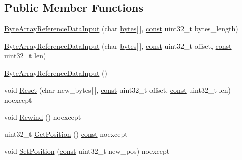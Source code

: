 \subsection*{Public Member Functions}
\begin{DoxyCompactItemize}
\item 
\mbox{\hyperlink{classlucene_1_1core_1_1store_1_1ByteArrayReferenceDataInput_aaeb2166ee337aa6f737b7c184924e4dc}{Byte\+Array\+Reference\+Data\+Input}} (char \mbox{\hyperlink{classlucene_1_1core_1_1store_1_1ByteArrayReferenceDataInput_ac71ae2183a9bd8ee669a7d5212a48d48}{bytes}}\mbox{[}$\,$\mbox{]}, \mbox{\hyperlink{ZlibCrc32_8h_a2c212835823e3c54a8ab6d95c652660e}{const}} uint32\+\_\+t bytes\+\_\+length)
\item 
\mbox{\hyperlink{classlucene_1_1core_1_1store_1_1ByteArrayReferenceDataInput_a0c0f41a361e85f1b081295c375ba5a65}{Byte\+Array\+Reference\+Data\+Input}} (char \mbox{\hyperlink{classlucene_1_1core_1_1store_1_1ByteArrayReferenceDataInput_ac71ae2183a9bd8ee669a7d5212a48d48}{bytes}}\mbox{[}$\,$\mbox{]}, \mbox{\hyperlink{ZlibCrc32_8h_a2c212835823e3c54a8ab6d95c652660e}{const}} uint32\+\_\+t offset, \mbox{\hyperlink{ZlibCrc32_8h_a2c212835823e3c54a8ab6d95c652660e}{const}} uint32\+\_\+t len)
\item 
\mbox{\hyperlink{classlucene_1_1core_1_1store_1_1ByteArrayReferenceDataInput_a7139a4a2aee2030b6efcf79b798d6435}{Byte\+Array\+Reference\+Data\+Input}} ()
\item 
void \mbox{\hyperlink{classlucene_1_1core_1_1store_1_1ByteArrayReferenceDataInput_a287e2f7dbaa01e82bc6ad0eb787c263c}{Reset}} (char new\+\_\+bytes\mbox{[}$\,$\mbox{]}, \mbox{\hyperlink{ZlibCrc32_8h_a2c212835823e3c54a8ab6d95c652660e}{const}} uint32\+\_\+t offset, \mbox{\hyperlink{ZlibCrc32_8h_a2c212835823e3c54a8ab6d95c652660e}{const}} uint32\+\_\+t len) noexcept
\item 
void \mbox{\hyperlink{classlucene_1_1core_1_1store_1_1ByteArrayReferenceDataInput_a08128c222d7e6711056f954fe332d23b}{Rewind}} () noexcept
\item 
uint32\+\_\+t \mbox{\hyperlink{classlucene_1_1core_1_1store_1_1ByteArrayReferenceDataInput_a360f7589bdca06fa20536871affa2a4a}{Get\+Position}} () \mbox{\hyperlink{ZlibCrc32_8h_a2c212835823e3c54a8ab6d95c652660e}{const}} noexcept
\item 
void \mbox{\hyperlink{classlucene_1_1core_1_1store_1_1ByteArrayReferenceDataInput_adf107ef130c119ae69f209ee597a5d6e}{Set\+Position}} (\mbox{\hyperlink{ZlibCrc32_8h_a2c212835823e3c54a8ab6d95c652660e}{const}} uint32\+\_\+t new\+\_\+pos) noexcept

\end{DoxyCompactItemize}
